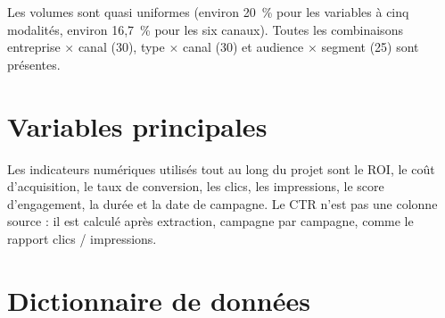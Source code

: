 Les volumes sont quasi uniformes (environ 20~\% pour les variables à cinq modalités, environ 16,7~\% pour les six canaux). Toutes les combinaisons entreprise $\times$ canal (30), type $\times$ canal (30) et audience $\times$ segment (25) sont présentes.

\section{Variables principales}

Les indicateurs numériques utilisés tout au long du projet sont le ROI, le coût d'acquisition, le taux de conversion, les clics, les impressions, le score d'engagement, la durée et la date de campagne. Le CTR n'est pas une colonne source : il est calculé après extraction, campagne par campagne, comme le rapport clics / impressions.

\section{Dictionnaire de données}

